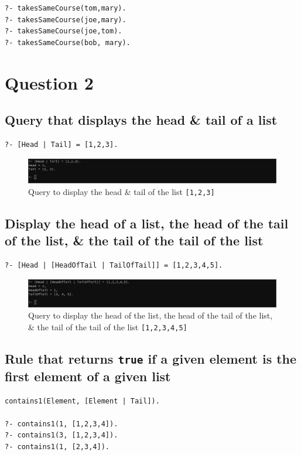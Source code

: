 \documentclass[a4paper]{article}
\begin{document}
\begin{verbatim}
?- takesSameCourse(tom,mary).
?- takesSameCourse(joe,mary).
?- takesSameCourse(joe,tom).
?- takesSameCourse(bob, mary).
\end{verbatim}

\section{Question 2}
\subsection{Query that displays the head \& tail of a list}
\begin{verbatim}
?- [Head | Tail] = [1,2,3].
\end{verbatim}

\begin{figure}[H]
    \includegraphics[width=\textwidth]{./images/q2_1.png}
    \caption{Query to display the head \& tail of the list \texttt{[1,2,3]}}
\end{figure}

\subsection{Display the head of a list, the head of the tail of the list, \& the tail of the tail of the list}
\begin{verbatim}
?- [Head | [HeadOfTail | TailOfTail]] = [1,2,3,4,5].
\end{verbatim}

\begin{figure}[H]
    \includegraphics[width=\textwidth]{./images/q2_2.png}
    \caption{Query to display the head of the list, the head of the tail of the list, \& the tail of the tail of the list \texttt{[1,2,3,4,5]}}
\end{figure}

\subsection{Rule that returns \texttt{true} if a given element is the first element of a given list}
\begin{verbatim}
contains1(Element, [Element | Tail]).

?- contains1(1, [1,2,3,4]).
?- contains1(3, [1,2,3,4]).
?- contains1(1, [2,3,4]).
\end{verbatim}
\end{document}
